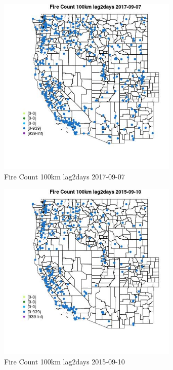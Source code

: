 \begin{figure} 
\centering  
\includegraphics[width=0.77\textwidth]{Code_Outputs/Report_ML_input_PM25_Step4_part_e_de_duplicated_aves_compiled_2019-05-21wNAs_MapObsFire_Count_100km_lag2days2017-09-07.jpg} 
\caption{\label{fig:Report_ML_input_PM25_Step4_part_e_de_duplicated_aves_compiled_2019-05-21wNAsMapObsFire_Count_100km_lag2days2017-09-07}Fire Count 100km lag2days 2017-09-07} 
\end{figure} 
 

\begin{figure} 
\centering  
\includegraphics[width=0.77\textwidth]{Code_Outputs/Report_ML_input_PM25_Step4_part_e_de_duplicated_aves_compiled_2019-05-21wNAs_MapObsFire_Count_100km_lag2days2015-09-10.jpg} 
\caption{\label{fig:Report_ML_input_PM25_Step4_part_e_de_duplicated_aves_compiled_2019-05-21wNAsMapObsFire_Count_100km_lag2days2015-09-10}Fire Count 100km lag2days 2015-09-10} 
\end{figure} 
 


